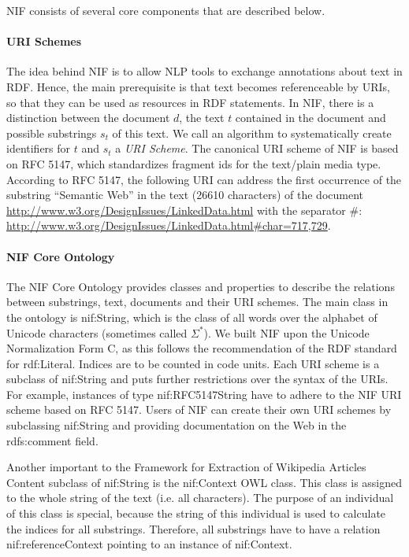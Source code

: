 \documentclass[thesis=M,english,hidelinks]{FITthesis}[2019/12/23]
\begin{document}
\gls{NIF} consists of several core components that are described below.

\paragraph{URI Schemes}

The idea behind NIF is to allow NLP tools to exchange annotations about text in RDF. Hence, the main prerequisite is that text becomes referenceable by URIs, so that they can be used as resources in RDF statements. In NIF, there is a distinction between the document $d$, the text $t$ contained in the document and possible substrings $s_{t}$ of this text.  We call an algorithm to systematically create identifiers for $t$ and $s_{t}$ a \textit{URI Scheme}.  The canonical URI scheme of NIF is based on RFC 5147\cite{nif_rdf}, which standardizes fragment ids for the text/plain media type. According to RFC 5147, the following URI can address the first occurrence of the substring “Semantic Web” in the
text (26610 characters) of the document \url{http://www.w3.org/DesignIssues/LinkedData.html} with the separator \#: \url{http://www.w3.org/DesignIssues/LinkedData.html\#char=717,729}.

\paragraph{NIF Core Ontology}



The NIF Core Ontology\cite{nif_core_ontology} provides classes and properties to describe the relations between substrings, text, documents and their URI schemes. The main class in the ontology is nif:String, which is the class of all words over the alphabet of Unicode characters (sometimes called $\Sigma^{*}$). We built NIF upon the Unicode Normalization Form C, as this follows the recommendation of the RDF standard for rdf:Literal. Indices are to be counted in code units. Each URI scheme is a subclass of nif:String and puts further restrictions over the syntax of the URIs. For example, instances of type nif:RFC5147String have to adhere to the NIF URI scheme based on RFC 5147. Users of NIF can create their own URI schemes by subclassing nif:String and providing documentation on the Web in the rdfs:comment field.

Another important to the Framework for Extraction of Wikipedia Articles Content subclass of nif:String is the nif:Context OWL class. This class is assigned to the whole string of the text (i.e. all characters). The purpose of an individual of this class is special, because the string of this individual is used to calculate the indices for all substrings. Therefore, all substrings have to have a relation nif:referenceContext pointing to an instance of nif:Context.
\end{document}
